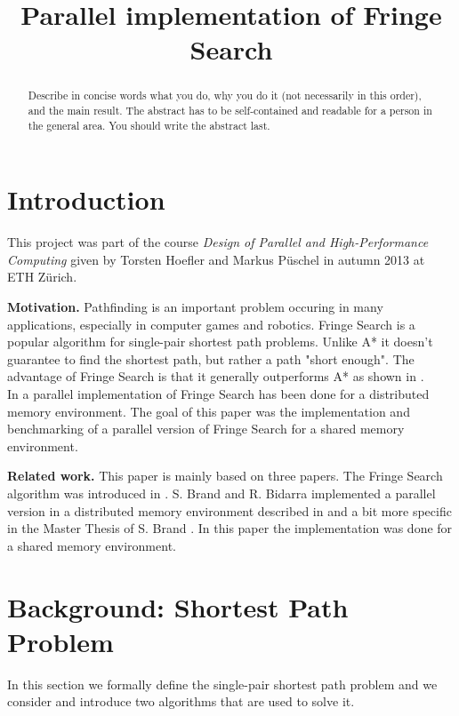 \documentclass[letterpaper]{article}
\title{Parallel implementation of Fringe Search}
\newcommand{\mypar}[1]{{\bf #1.}}
\begin{document}
%
\maketitle
%

\begin{abstract}
Describe in concise words what you do, why you do it (not necessarily
in this order), and the main result.  The abstract has to be
self-contained and readable for a person in the general area. You
should write the abstract last.
\end{abstract}

\section{Introduction}\label{sec:intro}

This project was part of the course \textit{Design of Parallel and High-Performance Computing} given by Torsten Hoefler and Markus Püschel in autumn 2013 at ETH Zürich.


\mypar{Motivation} 
Pathfinding is an important problem occuring in many applications, especially in computer games and robotics. Fringe Search is a popular algorithm for single-pair shortest path problems. Unlike A* it doesn't guarantee to find the shortest path, but rather a path "short enough". The advantage of Fringe Search is that it generally outperforms A* as shown in \cite{fringe:05}.\\
In \cite{brand:09} a parallel implementation of Fringe Search has been done for a distributed memory environment. The goal of this paper was the implementation and benchmarking of a parallel version of Fringe Search for a shared memory environment.

\mypar{Related work} This paper is mainly based on three papers. The Fringe Search algorithm was introduced in \cite{fringe:05}. S. Brand and R. Bidarra implemented a parallel version in a distributed memory environment described in \cite{brand:12} and a bit more specific in the Master Thesis of S. Brand \cite{brand:09}. In this paper the implementation was done for a shared memory environment.

\section{Background: Shortest Path Problem}\label{sec:background}
In this section we formally define the single-pair shortest path problem and we consider and introduce two algorithms that are used to solve it.
\end{document}
